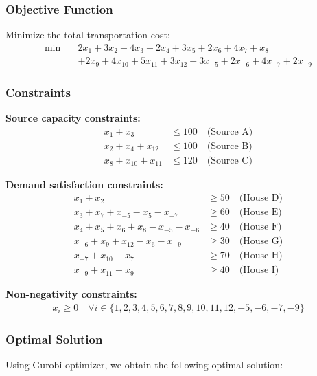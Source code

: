 \documentclass[11pt]{article}
\begin{document}
\begin{enumerate}
\subsubsection*{Objective Function}
Minimize the total transportation cost:
\begin{align}
\min \quad & 2x_1 + 3x_2 + 4x_3 + 2x_4 + 3x_5 + 2x_6 + 4x_7 + x_8 \\
& + 2x_9 + 4x_{10} + 5x_{11} + 3x_{12} + 3x_{-5} + 2x_{-6} + 4x_{-7} + 2x_{-9}
\end{align}

\subsubsection*{Constraints}

\textbf{Source capacity constraints:}
\begin{align}
x_1 + x_3 &\leq 100 \quad \text{(Source A)} \\
x_2 + x_4 + x_{12} &\leq 100 \quad \text{(Source B)} \\
x_8 + x_{10} + x_{11} &\leq 120 \quad \text{(Source C)}
\end{align}

\textbf{Demand satisfaction constraints:}
\begin{align}
x_1 + x_2 &\geq 50 \quad \text{(House D)} \\
x_3 + x_7 + x_{-5} - x_5 - x_{-7} &\geq 60 \quad \text{(House E)} \\
x_4 + x_5 + x_6 + x_8 - x_{-5} - x_{-6} &\geq 40 \quad \text{(House F)} \\
x_{-6} + x_9 + x_{12} - x_6 - x_{-9} &\geq 30 \quad \text{(House G)} \\
x_{-7} + x_{10} - x_7 &\geq 70 \quad \text{(House H)} \\
x_{-9} + x_{11} - x_9 &\geq 40 \quad \text{(House I)}
\end{align}

\textbf{Non-negativity constraints:}
\begin{align}
x_i \geq 0 \quad \forall i \in \{1, 2, 3, 4, 5, 6, 7, 8, 9, 10, 11, 12, -5, -6, -7, -9\}
\end{align}

\subsubsection*{Optimal Solution}

Using Gurobi optimizer, we obtain the following optimal solution:


\end{enumerate}
\end{document}
